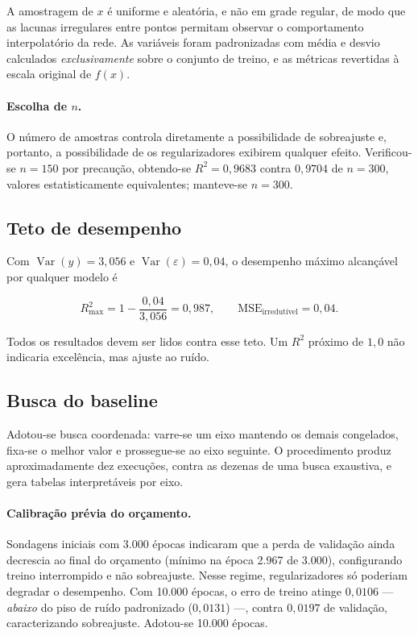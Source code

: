 \documentclass[11pt,a4paper]{article}
\begin{document}
A amostragem de $x$ é uniforme e aleatória, e não em grade regular, de modo que as
lacunas irregulares entre pontos permitam observar o comportamento interpolatório da
rede. As variáveis foram padronizadas com média e desvio calculados \emph{exclusivamente}
sobre o conjunto de treino, e as métricas revertidas à escala original de $f(x)$.

\paragraph{Escolha de $n$.} O número de amostras controla diretamente a possibilidade de
sobreajuste e, portanto, a possibilidade de os regularizadores exibirem qualquer efeito.
Verificou-se $n=150$ por precaução, obtendo-se $R^2 = 0{,}9683$ contra $0{,}9704$ de
$n=300$, valores estatisticamente equivalentes; manteve-se $n=300$.

\subsection{Teto de desempenho}

Com $\operatorname{Var}(y) = 3{,}056$ e $\operatorname{Var}(\varepsilon) = 0{,}04$, o
desempenho máximo alcançável por qualquer modelo é

\begin{equation}
R^2_{\max} = 1 - \frac{0{,}04}{3{,}056} = 0{,}987,
\qquad \mathrm{MSE}_{\text{irredutível}} = 0{,}04.
\end{equation}

Todos os resultados devem ser lidos contra esse teto. Um $R^2$ próximo de $1{,}0$ não
indicaria excelência, mas ajuste ao ruído.

\subsection{Busca do baseline}
\label{sec:reg-busca}

Adotou-se busca coordenada: varre-se um eixo mantendo os demais congelados, fixa-se o
melhor valor e prossegue-se ao eixo seguinte. O procedimento produz aproximadamente dez
execuções, contra as dezenas de uma busca exaustiva, e gera tabelas interpretáveis por
eixo.

\paragraph{Calibração prévia do orçamento.} Sondagens iniciais com 3.000 épocas
indicaram que a perda de validação ainda decrescia ao final do orçamento (mínimo na
época 2.967 de 3.000), configurando treino interrompido e não sobreajuste. Nesse regime,
regularizadores só poderiam degradar o desempenho. Com 10.000 épocas, o erro de treino
atinge $0{,}0106$ --- \emph{abaixo} do piso de ruído padronizado ($0{,}0131$) ---, contra
$0{,}0197$ de validação, caracterizando sobreajuste. Adotou-se 10.000 épocas.
\end{document}
